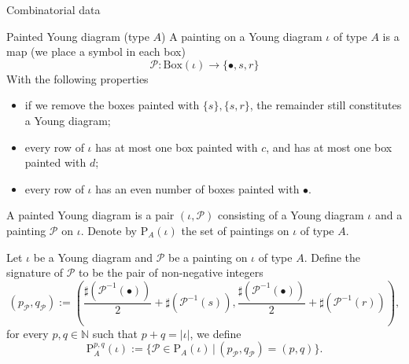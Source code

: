 \documentclass[fleqn,xcolor=dvipsnames]{beamer}
\newcommand{\BN}{{\mathbb {N}}}
\newcommand{\CP}{{\mathcal {P}}}
\newcommand{\set}[2]{\{#1\,|\,#2\}}
\begin{document}
\begin{frame}{Combinatorial data}
  \begin{block}{Painted Young diagram (type $A$)}
    A painting on a Young diagram $\iota$ of type $A$ is a map (we place a symbol in each box)
   $$\CP : \mathrm{Box}(\iota) \to \{ \bullet, s ,r \}$$
   With the following properties

   \begin{itemize}
      \pause\item if we remove the boxes painted with $\{s\}, \{s,r\}$, the remainder still constitutes a Young diagram;
      \pause\item every row of $\iota$ has at most one box painted with $c$, and has at most one box painted with $d$;
      \pause\item every row of $\iota$ has an even number of boxes painted with $\bullet$.
   \end{itemize}
   \pause A painted Young diagram is a pair $(\iota, \CP)$ consisting of a Young diagram $\iota$ and a painting $\CP$ on $\iota$. Denote by $\mathrm{P}_{A}(\iota)$ the set of paintings on $\iota$ of type $A$.
    
  \end{block}
\end{frame}






\begin{frame}
  Let $\iota$ be a Young diagram and $\CP$ be a painting on $\iota$ of type $A$. Define the signature of $\CP$ to be the pair of non-negative integers
   \begin{equation*}
    \left(p_{\CP}, q_{\CP}\right) := \left(\frac{\sharp(\CP^{-1}(\bullet))}{2} + \sharp(\CP^{-1}(s)), \frac{\sharp(\CP^{-1}(\bullet))}{2}+ \sharp(\CP^{-1}(r))\right),
   \end{equation*}
   for every $p,q \in \BN$ such that $p + q = |\iota|$, we define
   \begin{equation*}
        \mathrm{P}_{A}^{p,q}(\iota) := \set{\CP \in \mathrm{P}_{A}(\iota)}{(p_{\CP},q_{\CP}) = (p,q)}.       
   \end{equation*}
\end{frame}
\end{document}
